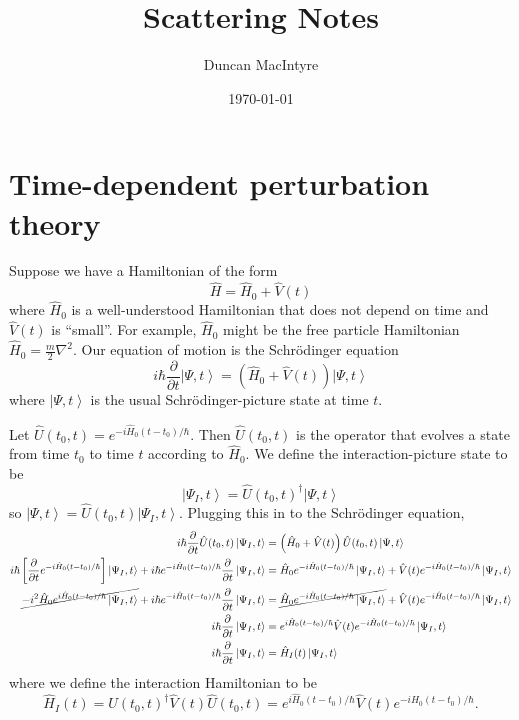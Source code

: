 \documentclass[11pt]{article}
\newcommand{\ket}[1]{\left|#1\right\rangle}
\newcommand{\op}[1]{\hat{#1}}
\theoremstyle{theorem}
\theoremstyle{remark}
\theoremstyle{step}
\theoremstyle{gap}
\begin{document}
\title{Scattering Notes}
\author{Duncan MacIntyre}
\date{\today}
\maketitle
\tableofcontents
\bigskip
\newpage

\section{Time-dependent perturbation theory}

Suppose we have a Hamiltonian of the form \[\op{H} = \op{H}_0 + \op{V}(t)\]
where \(\op{H}_0\) is a well-understood Hamiltonian that does not depend on time and \(\op{V}(t)\) is ``small''. For example, \(\op{H}_0\) might be the free particle Hamiltonian \(\op{H}_0 = \frac{m}{2} \nabla^2\). Our equation of motion is the Schr\"odinger equation
\[i \hbar \frac{\partial}{\partial t} \ket{\Psi, t} = \left(\op{H}_0 + \op{V}(t)\right) \ket{\Psi, t}\]
where \(\ket{\Psi, t}\) is the usual Schr\"odinger-picture state at time \(t\).

Let \(\op{U}(t_0, t) = e^{-i\op{H}_0(t-t_0)/\hbar}\). Then \(\op{U}(t_0, t)\) is the operator that evolves a state from time \(t_0\) to time \(t\) according to \(\op{H}_0\). We define the interaction-picture state to be
\[\ket{\Psi_I, t} = \op{U}(t_0, t)^\dagger \ket{\Psi, t}\]
so \(\ket{\Psi, t} = \op{U}(t_0, t) \ket{\Psi_I, t}\).
Plugging this in to the Schr\"odinger equation,
\begin{align*}
i \hbar \frac{\partial}{\partial t} \op{U}(t_0, t)\ket{\Psi_I, t} &= \left(\op{H}_0 + \op{V}(t)\right) \op{U}(t_0, t)\ket{\Psi, t} \\
i \hbar \left[\frac{\partial}{\partial t} e^{-i\op{H}_0(t-t_0)/\hbar}\right] \ket{\Psi_I, t} + i \hbar e^{-i\op{H}_0(t-t_0)/\hbar} \frac{\partial}{\partial t} \ket{\Psi_I, t} &= \op{H}_0 e^{-i\op{H}_0(t-t_0)/\hbar}\ket{\Psi_I, t} + \op{V}(t) e^{-i\op{H}_0(t-t_0)/\hbar}\ket{\Psi_I, t} \\
\cancel{-i^2 \op{H}_0 e^{i\op{H}_0(t-t_0)/\hbar} \ket{\Psi_I, t}} + i \hbar e^{-i\op{H}_0(t-t_0)/\hbar} \frac{\partial}{\partial t} \ket{\Psi_I, t} &= \cancel{\op{H}_0 e^{-i\op{H}_0(t-t_0)/\hbar}\ket{\Psi_I, t}} + \op{V}(t) e^{-i\op{H}_0(t-t_0)/\hbar}\ket{\Psi_I, t} \\
 i \hbar \frac{\partial}{\partial t} \ket{\Psi_I, t} &= e^{i\op{H}_0(t-t_0)/\hbar}\op{V}(t) e^{-i\op{H}_0(t-t_0)/\hbar}\ket{\Psi_I, t} \\
 i \hbar \frac{\partial}{\partial t} \ket{\Psi_I, t} &= \op{H}_I(t)\ket{\Psi_I, t}
\end{align*}
where we define the interaction Hamiltonian to be
\[\op{H}_I(t) = \op{U}(t_0, t)^\dagger \op{V}(t)\op{U}(t_0, t) = e^{i\op{H}_0(t-t_0)/\hbar}\op{V}(t) e^{-i\op{H}_0(t-t_0)/\hbar}.\]
\end{document}
